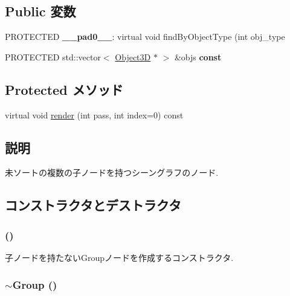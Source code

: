 \subsection*{Public 変数}
\begin{CompactItemize}
\item 
\hypertarget{classm3g_1_1Group_11d260eb623ff241a55524ad8bc9beb4}{
PROTECTED \textbf{\_\-\_\-pad0\_\-\_\-}: virtual void findByObjectType (int obj\_\-type}
\label{classm3g_1_1Group_11d260eb623ff241a55524ad8bc9beb4}

\item 
\hypertarget{classm3g_1_1Group_2c0e83157a767e0c6d0ae4111bda0233}{
PROTECTED std::vector$<$ \hyperlink{classm3g_1_1Object3D}{Object3D} $\ast$ $>$ \&objs \textbf{const}}
\label{classm3g_1_1Group_2c0e83157a767e0c6d0ae4111bda0233}

\end{CompactItemize}
\subsection*{Protected メソッド}
\begin{CompactItemize}
\item 
virtual void \hyperlink{classm3g_1_1Group_1efcb1973989d9963d5bd6d03065d389}{render} (int pass, int index=0) const 
\end{CompactItemize}


\subsection{説明}
未ソートの複数の子ノードを持つシーングラフのノード. 

\subsection{コンストラクタとデストラクタ}
\hypertarget{classm3g_1_1Group_0b29b9393b4b6856ac75b759f4166c13}{
\subsubsection[{Group}]{ ()}}
\label{classm3g_1_1Group_0b29b9393b4b6856ac75b759f4166c13}


子ノードを持たないGroupノードを作成するコンストラクタ. \hypertarget{classm3g_1_1Group_a2a755272411c0d861f46f30970f5ca5}{
\subsubsection[{$\sim$Group}]{\setlength{\rightskip}{0pt plus 5cm}$\sim${\bf Group} ()}}
\label{classm3g_1_1Group_a2a755272411c0d861f46f30970f5ca5}


